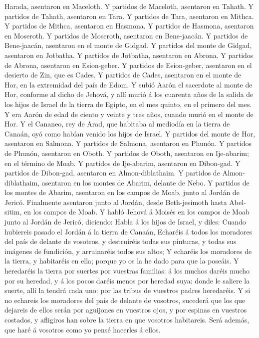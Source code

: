 Harada, asentaron en Maceloth.  Y partidos de Maceloth,
asentaron en Tahath.  Y partidos de Tahath, asentaron en
Tara.  Y partidos de Tara, asentaron en Mithca.
 Y partidos de Mithca, asentaron en Hasmona.
 Y partidos de Hasmona, asentaron en Moseroth.
 Y partidos de Moseroth, asentaron en Bene-jaacán.
 Y partidos de Bene-jaacán, asentaron en el monte de
Gidgad.  Y partidos del monte de Gidgad, asentaron en
Jotbatha.  Y partidos de Jotbatha, asentaron en Abrona.
 Y partidos de Abrona, asentaron en Esion-geber.
 Y partidos de Esion-geber, asentaron en el desierto de
Zin, que es Cades.  Y partidos de Cades, asentaron en el
monte de Hor, en la extremidad del país de Edom.  Y subió
Aarón el sacerdote al monte de Hor, conforme al dicho de Jehová, y allí
murió á los cuarenta años de la salida de los hijos de Israel de la
tierra de Egipto, en el mes quinto, en el primero del mes.
 Y era Aarón de edad de ciento y veinte y tres años,
cuando murió en el monte de Hor.  Y el Cananeo, rey de
Arad, que habitaba al mediodía en la tierra de Canaán, oyó como habían
venido los hijos de Israel.  Y partidos del monte de Hor,
asentaron en Salmona.  Y partidos de Salmona, asentaron
en Phunón.  Y partidos de Phunón, asentaron en Oboth.
 Y partidos de Oboth, asentaron en Ije-abarim; en el
término de Moab.  Y partidos de Ije-abarim, asentaron en
Dibon-gad.  Y partidos de Dibon-gad, asentaron en
Almon-diblathaim.  Y partidos de Almon-diblathaim,
asentaron en los montes de Abarim, delante de Nebo.  Y
partidos de los montes de Abarim, asentaron en los campos de Moab, junto
al Jordán de Jericó.  Finalmente asentaron junto al
Jordán, desde Beth-jesimoth hasta Abel-sitim, en los campos de Moab.
 Y habló Jehová á Moisés en los campos de Moab junto al
Jordán de Jericó, diciendo:  Habla á los hijos de Israel,
y diles: Cuando hubiereis pasado el Jordán á la tierra de Canaán,
 Echaréis á todos los moradores del país de delante de
vosotros, y destruiréis todas sus pinturas, y todas sus imágenes de
fundición, y arruinaréis todos sus altos;  Y echaréis los
moradores de la tierra, y habitaréis en ella; porque yo os la he dado
para que la poseáis.  Y heredaréis la tierra por suertes
por vuestras familias: á los muchos daréis mucho por su heredad, y á los
pocos daréis menos por heredad suya: donde le saliere la suerte, allí la
tendrá cada uno: por las tribus de vuestros padres heredaréis.
 Y si no echareis los moradores del país de delante de
vosotros, sucederá que los que dejareis de ellos serán por aguijones en
vuestros ojos, y por espinas en vuestros costados, y afligiros han sobre
la tierra en que vosotros habitareis.  Será además, que
haré á vosotros como yo pensé hacerles á ellos.

